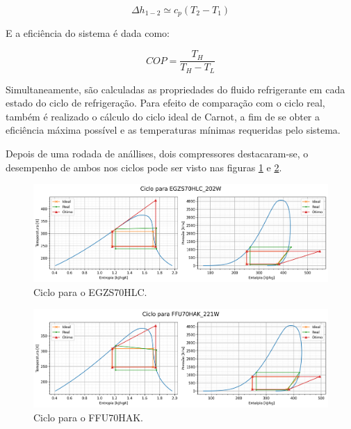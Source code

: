 \begin{equation}
    \Delta h_{1-2} \simeq  c_p (T_2-T_1)
    \label{simplificacao entalpia}
\end{equation}

    E a eficiência do sistema é dada como:

\begin{equation}
    COP = \frac{T_H}{T_H - T_L}
    \label{COP carnot}
\end{equation}

\newpage    

Simultaneamente, são calculadas as propriedades do fluido refrigerante em cada estado do ciclo de refrigeração. Para efeito de comparação com o ciclo real, também é realizado o cálculo do ciclo ideal de Carnot, a fim de se obter a eficiência máxima possível e as temperaturas mínimas requeridas pelo sistema.

Depois de uma rodada de anállises, dois compressores destacaram-se, o desempenho de ambos nos ciclos pode ser visto nas figuras \ref{fig:ciclo comp 1} e \ref{fig:ciclo comp 2}.

\begin{figure}[ht]
    \centering
    \includegraphics[width=0.9\linewidth]{Imagens/Desenvolvimento/ciclo_EGZS70HLC_202W.png}
    \caption{Ciclo para o EGZS70HLC.}
    \label{fig:ciclo comp 1}
\end{figure}

\begin{figure}[ht]
    \centering
    \includegraphics[width=0.9\linewidth]{Imagens/Desenvolvimento/ciclo_FFU70HAK_221W.png}
    \caption{Ciclo para o FFU70HAK.}
    \label{fig:ciclo comp 2}
\end{figure}

